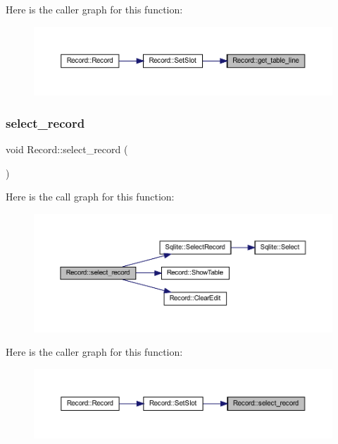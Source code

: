 Here is the caller graph for this function\+:
\nopagebreak
\begin{figure}[H]
\begin{center}
\leavevmode
\includegraphics[width=350pt]{class_record_a89ae432465b31de8a27e2fe8e929b62a_icgraph}
\end{center}
\end{figure}
\mbox{\label{class_record_a5fdd1f2b39a2de50ec73b57bb24bb8dc}} 
\subsubsection{\texorpdfstring{select\_record}{select\_record}}
{\footnotesize\ttfamily void Record\+::select\+\_\+record (\begin{DoxyParamCaption}{ }\end{DoxyParamCaption})\hspace{0.3cm}{\ttfamily [slot]}}

Here is the call graph for this function\+:
\nopagebreak
\begin{figure}[H]
\begin{center}
\leavevmode
\includegraphics[width=350pt]{class_record_a5fdd1f2b39a2de50ec73b57bb24bb8dc_cgraph}
\end{center}
\end{figure}
Here is the caller graph for this function\+:
\nopagebreak
\begin{figure}[H]
\begin{center}
\leavevmode
\includegraphics[width=350pt]{class_record_a5fdd1f2b39a2de50ec73b57bb24bb8dc_icgraph}
\end{center}
\end{figure}
\mbox{\label{class_record_ac08eeade2dbe9fd49ba7d508865f2ab1}} 
